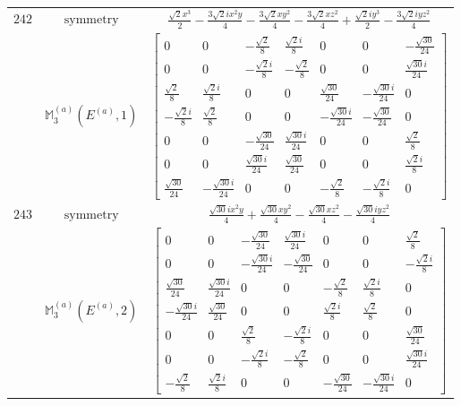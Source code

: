 \documentclass[fleqn,8pt,landscape]{jsarticle}
\begin{document}
\begin{longtable}{ccc}
$ 242 $ & $ \text{symmetry} $ & $ \frac{\sqrt{2} x^{3}}{2} - \frac{3 \sqrt{2} i x^{2} y}{4} - \frac{3 \sqrt{2} x y^{2}}{4} - \frac{3 \sqrt{2} x z^{2}}{4} + \frac{\sqrt{2} i y^{3}}{2} - \frac{3 \sqrt{2} i y z^{2}}{4} $ \\
$  $ & $ \mathbb{M}_{3}^{(a)}(E^{(a)},1) $ & $ \begin{bmatrix} 0 & 0 & - \frac{\sqrt{2}}{8} & \frac{\sqrt{2} i}{8} & 0 & 0 & - \frac{\sqrt{30}}{24} \\ 0 & 0 & - \frac{\sqrt{2} i}{8} & - \frac{\sqrt{2}}{8} & 0 & 0 & \frac{\sqrt{30} i}{24} \\ \frac{\sqrt{2}}{8} & \frac{\sqrt{2} i}{8} & 0 & 0 & \frac{\sqrt{30}}{24} & - \frac{\sqrt{30} i}{24} & 0 \\ - \frac{\sqrt{2} i}{8} & \frac{\sqrt{2}}{8} & 0 & 0 & - \frac{\sqrt{30} i}{24} & - \frac{\sqrt{30}}{24} & 0 \\ 0 & 0 & - \frac{\sqrt{30}}{24} & \frac{\sqrt{30} i}{24} & 0 & 0 & \frac{\sqrt{2}}{8} \\ 0 & 0 & \frac{\sqrt{30} i}{24} & \frac{\sqrt{30}}{24} & 0 & 0 & \frac{\sqrt{2} i}{8} \\ \frac{\sqrt{30}}{24} & - \frac{\sqrt{30} i}{24} & 0 & 0 & - \frac{\sqrt{2}}{8} & - \frac{\sqrt{2} i}{8} & 0 \end{bmatrix} $ \\ \hline
$ 243 $ & $ \text{symmetry} $ & $ \frac{\sqrt{30} i x^{2} y}{4} + \frac{\sqrt{30} x y^{2}}{4} - \frac{\sqrt{30} x z^{2}}{4} - \frac{\sqrt{30} i y z^{2}}{4} $ \\
$  $ & $ \mathbb{M}_{3}^{(a)}(E^{(a)},2) $ & $ \begin{bmatrix} 0 & 0 & - \frac{\sqrt{30}}{24} & \frac{\sqrt{30} i}{24} & 0 & 0 & \frac{\sqrt{2}}{8} \\ 0 & 0 & - \frac{\sqrt{30} i}{24} & - \frac{\sqrt{30}}{24} & 0 & 0 & - \frac{\sqrt{2} i}{8} \\ \frac{\sqrt{30}}{24} & \frac{\sqrt{30} i}{24} & 0 & 0 & - \frac{\sqrt{2}}{8} & \frac{\sqrt{2} i}{8} & 0 \\ - \frac{\sqrt{30} i}{24} & \frac{\sqrt{30}}{24} & 0 & 0 & \frac{\sqrt{2} i}{8} & \frac{\sqrt{2}}{8} & 0 \\ 0 & 0 & \frac{\sqrt{2}}{8} & - \frac{\sqrt{2} i}{8} & 0 & 0 & \frac{\sqrt{30}}{24} \\ 0 & 0 & - \frac{\sqrt{2} i}{8} & - \frac{\sqrt{2}}{8} & 0 & 0 & \frac{\sqrt{30} i}{24} \\ - \frac{\sqrt{2}}{8} & \frac{\sqrt{2} i}{8} & 0 & 0 & - \frac{\sqrt{30}}{24} & - \frac{\sqrt{30} i}{24} & 0 \end{bmatrix} $ \\ \hline

\end{longtable}
\end{document}

